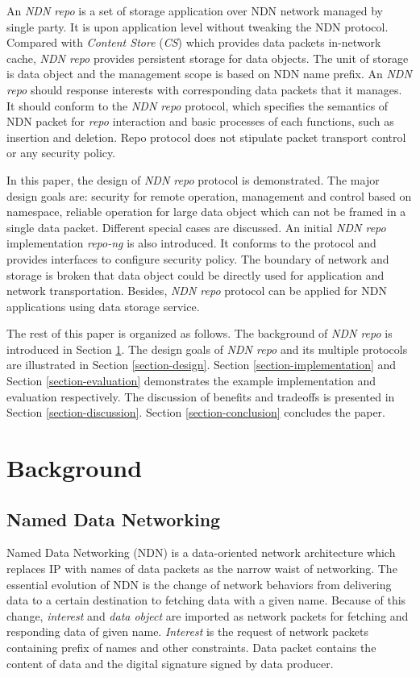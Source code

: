 \documentclass[conference]{IEEEtran}
\begin{document}
An \emph{NDN repo} is a set of storage application over NDN network managed by single party. It is upon application level without tweaking the NDN protocol. Compared with \emph{Content Store} (\emph{CS}) which provides data packets in-network cache, \emph{NDN repo} provides persistent storage for data objects. The unit of storage is data object and the management scope is based on NDN name prefix. An \emph{NDN repo} should response interests with corresponding data packets that it manages. It should conform to the \emph{NDN repo} protocol, which specifies the semantics of NDN packet for \emph{repo} interaction and basic processes of each functions, such as insertion and deletion. Repo protocol does not stipulate packet transport control or any security policy.

In this paper, the design of \emph{NDN repo} protocol is demonstrated. The major design goals are: security for remote operation, management and control based on namespace, reliable operation for large data object which can not be framed in a single data packet. Different special cases are discussed. An initial \emph{NDN repo} implementation \emph{repo-ng} is also introduced. It conforms to the protocol and provides interfaces to configure security policy. The boundary of network and storage is broken that data object could be directly used for application and network transportation. Besides, \emph{NDN repo} protocol can be applied for NDN applications using data storage service.

The rest of this paper is organized as follows.  The background of \emph{NDN repo} is introduced in Section \ref{section-background}. The design goals of \emph{NDN repo} and its multiple protocols are illustrated in Section \ref{section-design}. Section \ref{section-implementation} and Section \ref{section-evaluation} demonstrates the example implementation and evaluation respectively.  The discussion of benefits and tradeoffs is presented in Section \ref{section-discussion}. Section \ref{section-conclusion} concludes the paper.

\section{Background} \label{section-background}
\subsection{Named Data Networking}
Named Data Networking (NDN) \cite{zhang2010named} is a data-oriented network architecture which replaces IP with names of data packets as the narrow waist of networking. The essential evolution of NDN is the change of network behaviors from delivering data to a certain destination to fetching data with a given name. \cite{zhang2010named} Because of this change, \emph{interest} and \emph{data object} are imported as network packets for fetching and responding data of given name. \emph{Interest} is the request of network packets containing prefix of names and other constraints. Data packet contains the content of data and the digital signature signed by data producer.
\end{document}
